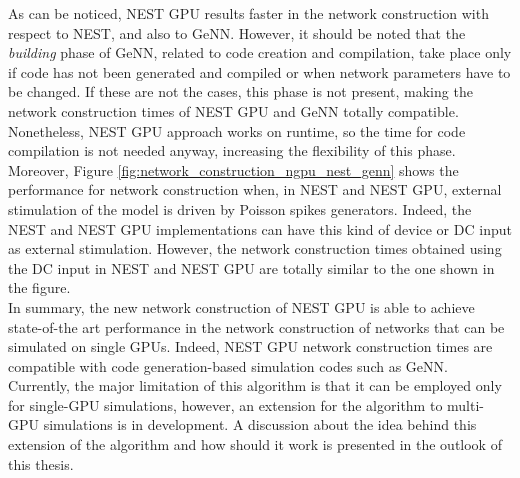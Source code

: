 \documentclass[a4paper, 12pt, twoside, openright]{book}
\begin{document}
As can be noticed, NEST GPU results faster in the network construction with respect to NEST, and also to GeNN. However, it should be noted that the \textit{building} phase of GeNN, related to code creation and compilation, take place only if code has not been generated and compiled or when network parameters have to be changed. If these are not the cases, this phase is not present, making the network construction times of NEST GPU and GeNN totally compatible. Nonetheless, NEST GPU approach works on runtime, so the time for code compilation is not needed anyway, increasing the flexibility of this phase.\\
Moreover, Figure \ref{fig:network_construction_ngpu_nest_genn} shows the performance for network construction when, in NEST and NEST GPU, external stimulation of the model is driven by Poisson spikes generators. Indeed, the NEST and NEST GPU implementations can have this kind of device or DC input as external stimulation. However, the network construction times obtained using the DC input in NEST and NEST GPU are totally similar to the one shown in the figure.\\
In summary, the new network construction of NEST GPU is able to achieve state-of-the art performance in the network construction of networks that can be simulated on single GPUs. Indeed, NEST GPU network construction times are compatible with code generation-based simulation codes such as GeNN. Currently, the major limitation of this algorithm is that it can be employed only for single-GPU simulations, however, an extension for the algorithm to multi-GPU simulations is in development. A discussion about the idea behind this extension of the algorithm and how should it work is presented in the outlook of this thesis.
\end{document}
